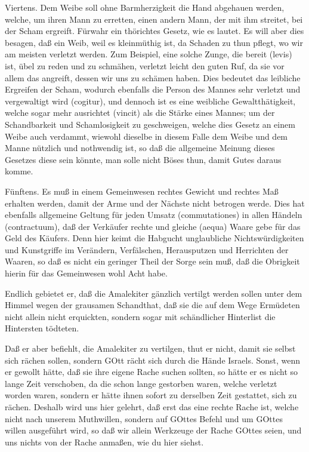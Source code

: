 Viertens. Dem Weibe soll ohne Barmherzigkeit die Hand abgehauen werden, welche, um ihren Mann zu erretten, einen andern Mann, der mit ihm streitet, bei der Scham ergreift. Fürwahr ein thörichtes Gesetz, wie es lautet. Es will aber dies besagen, daß ein Weib, weil es kleinmüthig ist, da Schaden zu thun pflegt, wo wir am meisten verletzt werden. Zum Beispiel, eine solche Zunge, die bereit (levis) ist, übel zu reden und zu schmähen, verletzt leicht den guten Ruf, da sie vor allem das angreift, dessen wir uns zu schämen haben. Dies bedeutet das leibliche Ergreifen der Scham, wodurch ebenfalls die Person des Mannes sehr verletzt und vergewaltigt wird (cogitur), und dennoch ist es eine weibliche Gewaltthätigkeit, welche sogar mehr ausrichtet (vincit) als die Stärke eines Mannes; um der Schandbarkeit und Schamlosigkeit zu geschweigen, welche dies Gesetz an einem Weibe auch verdammt, wiewohl dieselbe in diesem Falle dem Weibe und dem Manne nützlich und nothwendig ist, so daß die allgemeine Meinung dieses Gesetzes diese sein könnte, man solle nicht Böses thun, damit Gutes daraus komme.

Fünftens. Es muß in einem Gemeinwesen rechtes Gewicht und rechtes Maß erhalten werden, damit der Arme und der Nächste nicht betrogen werde. Dies hat ebenfalls allgemeine Geltung für jeden Umsatz (commutationes) in allen Händeln (contractuum), daß der Verkäufer rechte und gleiche (aequa) Waare gebe für das Geld des Käufers. Denn hier keimt die Habgucht unglaubliche Nichtswürdigkeiten und Kunstgriffe im Verändern, Verfälschen, Herausputzen und Herrichten der Waaren, so daß es nicht ein geringer Theil der Sorge sein muß, daß die Obrigkeit hierin für das Gemeinwesen wohl Acht habe.

Endlich gebietet er, daß die Amalekiter gänzlich vertilgt werden sollen unter dem Himmel wegen der grausamen Schandthat, daß sie die auf dem Wege Ermüdeten nicht allein nicht erquickten, sondern sogar mit schändlicher Hinterlist die Hintersten tödteten.

Daß er aber befiehlt, die Amalekiter zu vertilgen, thut er nicht, damit sie selbst sich rächen sollen, sondern GOtt rächt sich durch die Hände Israels. Sonst, wenn er gewollt hätte, daß sie ihre eigene Rache suchen sollten, so hätte er es nicht so lange Zeit verschoben, da die schon lange gestorben waren, welche verletzt worden waren, sondern er hätte ihnen sofort zu derselben Zeit gestattet, sich zu rächen. Deshalb wird uns hier gelehrt, daß erst das eine rechte Rache ist, welche nicht nach unserem Muthwillen, sondern auf GOttes Befehl und um GOttes willen ausgeführt wird, so daß wir allein Werkzeuge der Rache GOttes seien, und uns nichts von der Rache anmaßen, wie du hier siehst.

